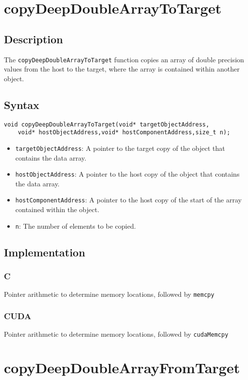 \newpage
\section{copyDeepDoubleArrayToTarget}

\subsection{Description}

The \verb+copyDeepDoubleArrayToTarget+ function copies an array of double precision values from the host to the target, where the array is contained within another object.

\subsection{Syntax}
\begin{verbatim}
void copyDeepDoubleArrayToTarget(void* targetObjectAddress,
    void* hostObjectAddress,void* hostComponentAddress,size_t n);
\end{verbatim}

\begin{itemize}
\item \verb+targetObjectAddress+: A pointer to the target copy of the object that contains the data array.
\item \verb+hostObjectAddress+: A pointer to the host copy of the object that contains the data array.
\item \verb+hostComponentAddress+: A pointer to the host copy of the start of the array contained within the object.
\item \verb+n+: The number of elements to be copied.
\end{itemize}

\subsection{Implementation}
\subsubsection{C}
Pointer arithmetic to determine memory locations, followed by \verb+memcpy+
\subsubsection{CUDA}
Pointer arithmetic to determine memory locations, followed by \verb+cudaMemcpy+

\newpage
\section{copyDeepDoubleArrayFromTarget}

